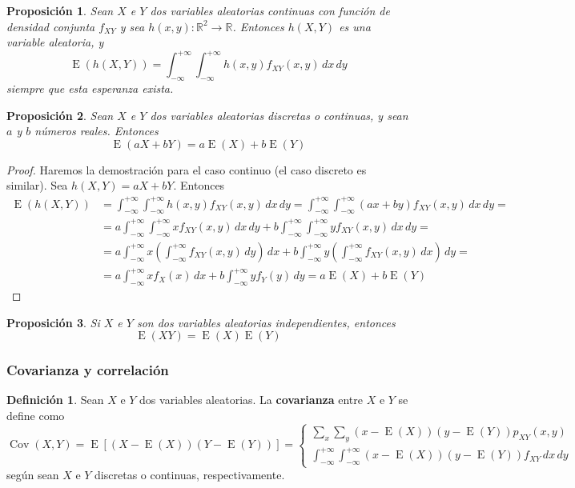 \documentclass[11pt]{article}
\theoremstyle{plain}
\newtheorem*{pro}{Proposición}
\theoremstyle{definition}
\newtheorem*{defi}{Definición}
\theoremstyle{remark}
\newcommand{\deft}[1]{\textbf{#1}}  %
\newcommand{\esp}[0]{\ensuremath{\operatorname{E}}}  %
\newcommand{\cov}[0]{\ensuremath{\operatorname{Cov}}}  %
\begin{document}
      \begin{pro}
        Sean $X$ e $Y$ dos variables aleatorias continuas con función de densidad conjunta $f_{XY}$ y sea $h(x,y) : \mathbb{R}^2 \to \mathbb{R}$. Entonces $h(X,Y)$ es una variable aleatoria, y
        \[ \esp(h(X,Y)) = \int_{-\infty}^{+\infty} \int_{-\infty}^{+\infty} h(x,y) f_{XY}(x,y) \,dx \,dy \]
        siempre que esta esperanza exista.
      \end{pro}

      \begin{pro}
        Sean $X$ e $Y$ dos variables aleatorias discretas o continuas, y sean $a$ y $b$ números reales. Entonces
        \[ \esp(aX + bY) = a\esp(X) + b\esp(Y) \]
      \end{pro}
      \begin{proof}
        Haremos la demostración para el caso continuo (el caso discreto es similar). Sea $h(X,Y) = aX + bY$. Entonces
        \[ \begin{split}
        \esp(h(X,Y)) &= \int_{-\infty}^{+\infty} \int_{-\infty}^{+\infty} h(x,y) f_{XY}(x,y) \,dx \,dy = \int_{-\infty}^{+\infty} \int_{-\infty}^{+\infty} (ax + by) f_{XY}(x,y) \,dx \,dy = \\
        &= a \int_{-\infty}^{+\infty} \int_{-\infty}^{+\infty} x f_{XY}(x,y) \,dx \,dy + b \int_{-\infty}^{+\infty} \int_{-\infty}^{+\infty} y f_{XY}(x,y) \,dx \,dy = \\
        &= a \int_{-\infty}^{+\infty} x \left( \int_{-\infty}^{+\infty} f_{XY}(x,y) \,dy \right) \,dx + b \int_{-\infty}^{+\infty} y \left( \int_{-\infty}^{+\infty} f_{XY}(x,y) \,dx \right) \,dy = \\
        &= a \int_{-\infty}^{+\infty} x f_X(x) \,dx + b \int_{-\infty}^{+\infty} y f_Y(y) \,dy = a \esp(X) + b \esp(Y)
        \end{split} \]
      \end{proof}

      \begin{pro}
        Si $X$ e $Y$ son dos variables aleatorias independientes, entonces
        \[ \esp(XY) = \esp(X) \esp(Y) \]
      \end{pro}

    \subsubsection{Covarianza y correlación}

      \begin{defi}
        Sean $X$ e $Y$ dos variables aleatorias. La \deft{covarianza} entre $X$ e $Y$ se define como
        \[ \cov(X,Y) = \esp\left[ (X - \esp(X)) (Y - \esp(Y)) \right] = \begin{cases}
          \displaystyle \sum_x \sum_y (x - \esp(X)) (y - \esp(Y)) p_{XY}(x,y) \\
          \displaystyle \int_{-\infty}^{+\infty} \int_{-\infty}^{+\infty} (x - \esp(X)) (y - \esp(Y)) f_{XY} \,dx \,dy
        \end{cases} \]
        según sean $X$ e $Y$ discretas o continuas, respectivamente.
      \end{defi}
\end{document}
